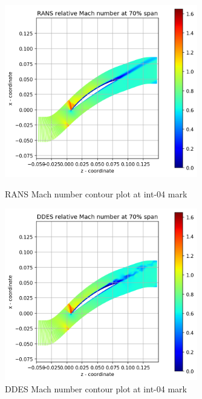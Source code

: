 \begin{figure}[ht]
  \centering
%  

  \includegraphics[width=0.75\textwidth]{Pictures/rans-mach-int-04.png}
  \caption{RANS Mach number contour plot at int-04 mark} \label{int-04-rans-mach}
  
   \vspace*{\floatsep}%
   
  \includegraphics[width=0.75\textwidth]{Pictures/ddes-mach-int-04.png}
  \caption{DDES Mach number contour plot at int-04 mark} \label{int-04-ddes-mach}
\end{figure}

